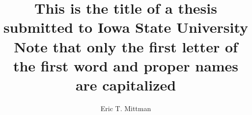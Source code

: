 \title{This is the title of a thesis
submitted to Iowa State University\\
Note that only the first letter of
the first word and proper names
are capitalized}

\author{Eric T. Mittman}

\notice


\maketitle
